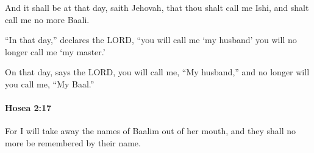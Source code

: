 			\begin{versebox}
					\item[BHS] 
					\item[LXX] 
					\item[ASV] And it shall be at that day, saith Jehovah, that thou shalt call me Ishi, and shalt call me no more Baali.
					\item[NIV] “In that day,” declares the LORD, “you will call me ‘my husband’ you will no longer call me ‘my master.’
					\item[NRSV] On that day, says the LORD, you will call me, “My husband,” and no longer will you call me, “My Baal.”
			\end{versebox}

		\paragraph{Hosea 2:17} %
			\label{HOSEA-2-17}

			For I will take away the names of Baalim out of her mouth, and they shall no more be remembered by their name.

